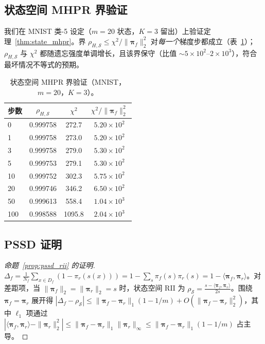 \subsection{状态空间 MHPR 界验证}
\label{app:chi2}

我们在 MNIST 类-5 设定（$m=20$ 状态，$K=3$ 留出）上验证定理~\ref{thm:state_mhpr}。界 $\rho_{H,\mathcal{S}} \le \chi^2/\|\boldsymbol{\pi}_f\|_2^2$ 对\emph{每一个}梯度步都成立（表~\ref{tab:chi2}）；$\rho_{H,\mathcal{S}}$ 与 $\chi^2$ 都随遗忘强度单调增长，且该界保守（比值 $\sim5\times10^2$--$2\times10^3$），符合最坏情况不等式的预期。

\begin{table}[t]
\centering
\small
\caption{状态空间 MHPR 界验证（MNIST，$m{=}20$，$K{=}3$）。}\label{tab:chi2}
\setlength{\tabcolsep}{6pt}
\begin{tabular}{l c c c}
\toprule
步数 & $\rho_{H,\mathcal{S}}$ & $\chi^2$ & $\chi^2/\|\boldsymbol{\pi}_f\|_2^2$ \\
\midrule
0     & 0.999758 & 272.7 & $5.20\times 10^2$ \\
1     & 0.999758 & 273.0 & $5.20\times 10^2$ \\
3     & 0.999758 & 279.0 & $5.30\times 10^2$ \\
5     & 0.999753 & 279.1 & $5.30\times 10^2$ \\
10    & 0.999752 & 302.3 & $5.75\times 10^2$ \\
20    & 0.999746 & 346.2 & $6.50\times 10^2$ \\
50    & 0.999613 & 558.4 & $1.04\times 10^3$ \\
100   & 0.998588 & 1095.8 & $2.04\times 10^3$ \\
\bottomrule
\end{tabular}
\end{table}

\subsection{PSSD 证明}

\begin{proof}[命题~\ref{prop:pssd_rii} 的证明]
$\Delta_f = \frac1{N_f}\sum_{x\in D_f}(1-\pi_r(s(x))) = 1-\sum_s\pi_f(s)\pi_r(s)=1-\langle\boldsymbol{\pi}_f,\boldsymbol{\pi}_r\rangle$。对差距项，当 $\|\boldsymbol{\pi}_f\|_2=\|\boldsymbol{\pi}_r\|_2=s$ 时，状态空间 RII 为 $\rho_{\mathcal{S}}=\frac{s-\langle\boldsymbol{\pi}_f,\boldsymbol{\pi}_r\rangle}{2s}$。围绕 $\boldsymbol{\pi}_f=\boldsymbol{\pi}_r$ 展开得 $|\Delta_f-\rho_{\mathcal{S}}|\le\|\boldsymbol{\pi}_f-\boldsymbol{\pi}_r\|_1(1-1/m)+O(\|\boldsymbol{\pi}_f-\boldsymbol{\pi}_r\|_2^2)$，其中 $\ell_1$ 项通过 $|\langle\boldsymbol{\pi}_f,\boldsymbol{\pi}_r\rangle-\|\boldsymbol{\pi}_r\|_2^2|\le\|\boldsymbol{\pi}_f-\boldsymbol{\pi}_r\|_1\|\boldsymbol{\pi}_r\|_\infty\le\|\boldsymbol{\pi}_f-\boldsymbol{\pi}_r\|_1(1-1/m)$ 占主导。
\end{proof}

